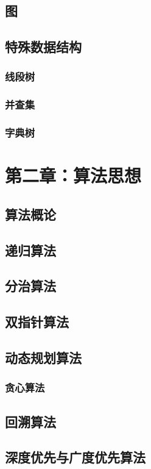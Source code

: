\documentclass[UTF8]{book}
\begin{document}
        \section{图}
        \section{特殊数据结构}
            \subsection{线段树}
            \subsection{并查集}
            \subsection{字典树}
    \newpage
    \chapter{第二章：算法思想}
        \section{算法概论}
        \section{递归算法}
        \section{分治算法}
        \section{双指针算法}
        \section{动态规划算法}
            \subsection{贪心算法}
        \section{回溯算法}
        \section{深度优先与广度优先算法}
\end{document}

